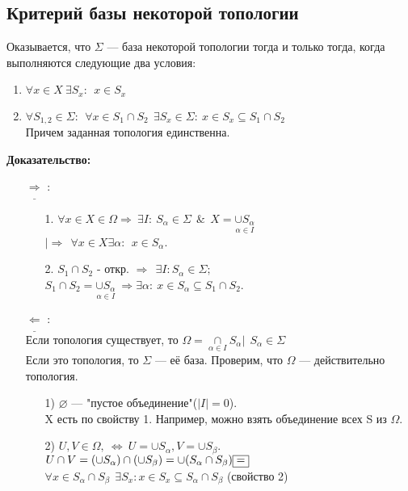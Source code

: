 \documentclass{article}
\begin{document}
\begin{spacing}{1.5}
\subsection{Критерий базы некоторой топологии}
Оказывается, что $\Sigma$ --- база некоторой топологии тогда и только тогда, когда выполняются следующие два условия:
\begin{enumerate}
\item $\forall x\in X ~\exists S_{x}:~~x\in S_{x}$
\item $\forall S_{1,2}\in \Sigma: ~~\forall x\in S_{1}\cap S_{2}~~ \exists S_{x}\in\Sigma:~x\in S_{x}\subseteq S_{1}\cap S_{2}$
\\ Причем заданная топология единственна.
\end{enumerate}
 \textbf{Доказательство:}
\begin{enumerate}
\item[$\underline{\Rightarrow}$]:
\begin{enumerate}
\item[1.] $\forall x\in X\in \Omega\Longrightarrow~\exists I:~ S_{\alpha}\in \Sigma ~~\&~~ X = \underset{\alpha\in I}{\cup S_{\alpha}} $
\\$|\Rightarrow~~ \forall x\in X \exists \alpha:~~x\in S_{\alpha}$.
\item[2.] $S_{1}\cap S_{2}$  - откр. $\Longrightarrow~~\exists I: S_{\alpha}\in\Sigma;$\\
$S_{1}\cap S_{2}=\underset{\alpha\in I}{\cup S_{\alpha}}~\Longrightarrow \exists\alpha:~x\in S_{\alpha}\subseteq S_{1}\cap S_{2}$. 
\end{enumerate}
\item[$\underline{\Leftarrow}$]:
\\ Если топология существует, то $\Omega = {\underset{\alpha\in I}{\cap}S_{\alpha}|~~S_{\alpha}\in\Sigma}$
\\ Если это топология, то $\Sigma$ --- её база. Проверим, что $\Omega$ --- действительно топология.
\begin{enumerate}
\item[1)] $\varnothing$ --- "пустое объединение"($|I|=0$).
\\X есть по свойству 1. Например, можно взять объединение всех S из $\Omega$.
\item[2)]$U, V\in\Omega,~\Longleftrightarrow ~ U=\cup S_{\alpha}, V = \cup S_{\beta}$.
\\ $U\cap V =(\cup S_{\alpha})\cap(\cup S_{\beta}) = \cup(S_{\alpha}\cap S_{\beta})\fbox{=} $
\\ $\forall x\in S_{\alpha}\cap S_{\beta}~~\exists S_{x}: x\in S_{x}\subseteq S_{\alpha}\cap S_{\beta}$      (свойство 2)

\end{enumerate}
\end{enumerate}
\end{spacing}
\end{document}
